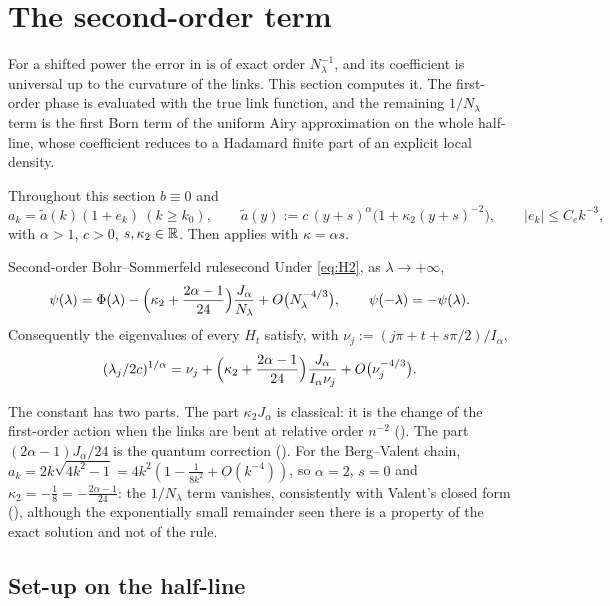 \section{The second-order term}\label{sec:second}

For a shifted power the error in  is of exact order $N_\lambda^{-1}$, and its
coefficient is universal up to the curvature of the links. This section computes it. The
first-order phase is evaluated with the true link function, and the remaining
$1/N_\lambda$ term is the first Born term of the uniform Airy approximation on the whole
half-line, whose coefficient reduces to a Hadamard finite part of an explicit local
density.

Throughout this section $b\equiv0$ and
\begin{equation}\label{eq:H2}
  a_k=\tilde a(k)(1+e_k)\ (k\ge k_0),\qquad
  \tilde a(y):=c\,(y+s)^\alpha\bigl(1+\kappa_2(y+s)^{-2}\bigr),\qquad |e_k|\le C_ek^{-3},
\end{equation}
with $\alpha>1$, $c>0$, $s,\kappa_2\in\mathbb{R}$. Then  applies with $\kappa=\alpha s$.

\begin{theorem}{Second-order Bohr--Sommerfeld rule}{second}
Under \eqref{eq:H2}, as $\lambda\to+\infty$,
\[
  \psi(\lambda)=\Phi(\lambda)-\Bigl(\kappa_2+\frac{2\alpha-1}{24}\Bigr)\frac{J_\alpha}{N_\lambda}+O\bigl(N_\lambda^{-4/3}\bigr),
  \qquad\psi(-\lambda)=-\psi(\lambda).
\]
Consequently the eigenvalues of every $H_t$ satisfy, with $\nu_j:=(j\pi+t+s\pi/2)/I_\alpha$,
\[
  (\lambda_j/2c)^{1/\alpha}=\nu_j+\Bigl(\kappa_2+\frac{2\alpha-1}{24}\Bigr)\frac{J_\alpha}{I_\alpha\nu_j}+O\bigl(\nu_j^{-4/3}\bigr).
\]
\end{theorem}

The constant has two parts. The part $\kappa_2J_\alpha$ is classical: it is the change of the
first-order action when the links are bent at relative order $n^{-2}$ ().
The part $(2\alpha-1)J_\alpha/24$ is the quantum correction (). For the Berg--Valent
chain, $a_k=2k\sqrt{4k^2-1}=4k^2(1-\frac1{8k^2}+O(k^{-4}))$, so $\alpha=2$, $s=0$ and
$\kappa_2=-\frac18=-\frac{2\alpha-1}{24}$: the $1/N_\lambda$ term vanishes, consistently with Valent's
closed form (), although the exponentially small remainder seen there is a
property of the exact solution and not of the rule.

\subsection{Set-up on the half-line}\label{sec:halfline}

